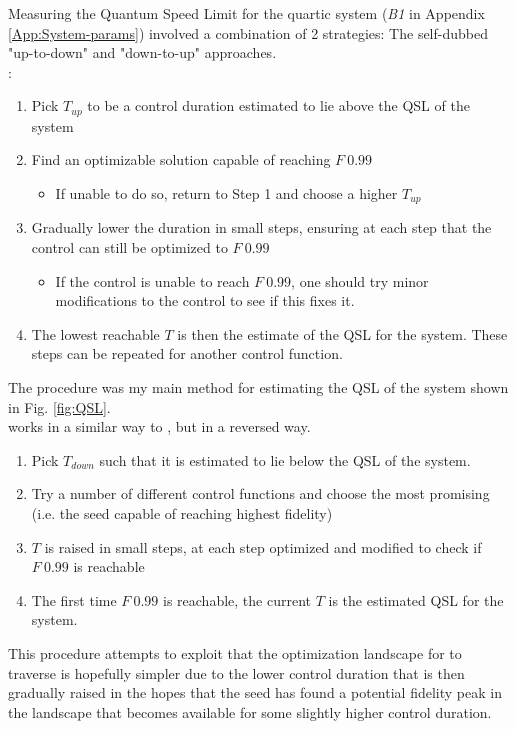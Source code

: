 \documentclass[a4paper, twocolumn]{revtex4-1}
\begin{document}
Measuring the Quantum Speed Limit for the quartic system (\textit{B1} in Appendix \ref{App:System-params}) involved a combination of 2 strategies: The self-dubbed "up-to-down" and "down-to-up" approaches. \\

:
\begin{enumerate}
	\item Pick $T_{up}$ to be a control duration estimated to lie above the QSL of the system
	\item Find an optimizable solution capable of reaching $F~0.99$
	\begin{itemize}
		\item If unable to do so, return to Step 1 and choose a higher $T_{up}$
	\end{itemize}
	\item Gradually lower the duration in small steps, ensuring at each step that the control can still be optimized to $F~0.99$
	\begin{itemize}
		\item If the control is unable to reach $F~0.99$, one should try minor modifications to the control to see if this fixes it. %
	\end{itemize}
	\item The lowest reachable $T$ is then the estimate of the QSL for the system. These steps can be repeated for another control function.
\end{enumerate}
The  procedure was my main method for estimating the QSL of the system shown in Fig. \ref{fig:QSL}.\\

 works in a similar way to , but in a reversed way.
\begin{enumerate}
	\item Pick $T_{down}$ such that it is estimated to lie below the QSL of the system.
	\item Try a number of different control functions and choose the most promising (i.e. the seed capable of reaching highest fidelity)
	\item $T$ is raised in small steps, at each step optimized and modified to check if $F~0.99$ is reachable
	\item The first time $F~0.99$ is reachable, the current $T$ is the estimated QSL for the system.
\end{enumerate}
This procedure attempts to exploit that the optimization landscape for  to traverse is hopefully simpler due to the lower control duration that is then gradually raised in the hopes that the seed has found a potential fidelity peak in the landscape that becomes available for some slightly higher control duration.
\end{document}
